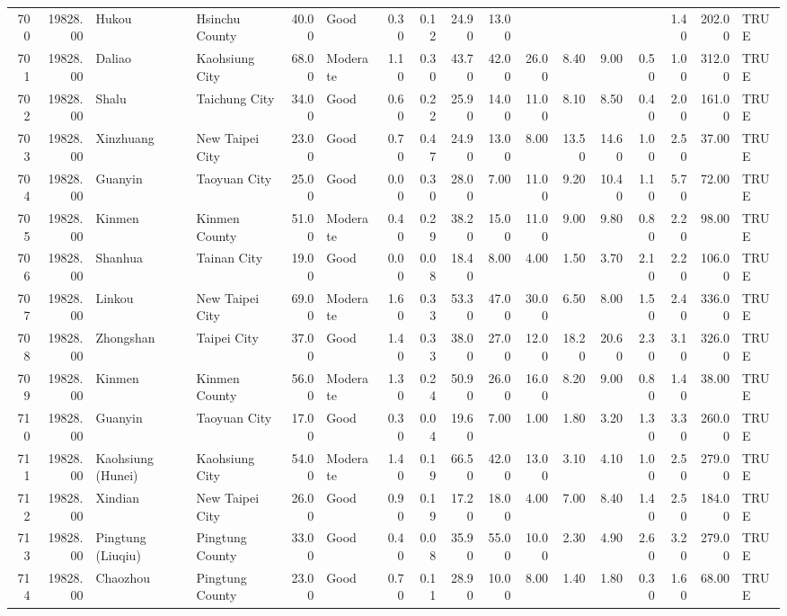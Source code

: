 \begin{table}[ht]
\begin{tabular}{rrllrlrrrrrrrrrrl}
  700 & 19828.00 & Hukou & Hsinchu County & 40.00 & Good & 0.30 & 0.12 & 24.90 & 13.00 &  &  &  &  & 1.40 & 202.00 & TRUE \\ 
  701 & 19828.00 & Daliao & Kaohsiung City & 68.00 & Moderate & 1.10 & 0.30 & 43.70 & 42.00 & 26.00 & 8.40 & 9.00 & 0.50 & 1.00 & 312.00 & TRUE \\ 
  702 & 19828.00 & Shalu & Taichung City & 34.00 & Good & 0.60 & 0.22 & 25.90 & 14.00 & 11.00 & 8.10 & 8.50 & 0.40 & 2.00 & 161.00 & TRUE \\ 
  703 & 19828.00 & Xinzhuang & New Taipei City & 23.00 & Good & 0.70 & 0.47 & 24.90 & 13.00 & 8.00 & 13.50 & 14.60 & 1.00 & 2.50 & 37.00 & TRUE \\ 
  704 & 19828.00 & Guanyin & Taoyuan City & 25.00 & Good & 0.00 & 0.30 & 28.00 & 7.00 & 11.00 & 9.20 & 10.40 & 1.10 & 5.70 & 72.00 & TRUE \\ 
  705 & 19828.00 & Kinmen & Kinmen County & 51.00 & Moderate & 0.40 & 0.29 & 38.20 & 15.00 & 11.00 & 9.00 & 9.80 & 0.80 & 2.20 & 98.00 & TRUE \\ 
  706 & 19828.00 & Shanhua & Tainan City & 19.00 & Good & 0.00 & 0.08 & 18.40 & 8.00 & 4.00 & 1.50 & 3.70 & 2.10 & 2.20 & 106.00 & TRUE \\ 
  707 & 19828.00 & Linkou & New Taipei City & 69.00 & Moderate & 1.60 & 0.33 & 53.30 & 47.00 & 30.00 & 6.50 & 8.00 & 1.50 & 2.40 & 336.00 & TRUE \\ 
  708 & 19828.00 & Zhongshan & Taipei City & 37.00 & Good & 1.40 & 0.33 & 38.00 & 27.00 & 12.00 & 18.20 & 20.60 & 2.30 & 3.10 & 326.00 & TRUE \\ 
  709 & 19828.00 & Kinmen & Kinmen County & 56.00 & Moderate & 1.30 & 0.24 & 50.90 & 26.00 & 16.00 & 8.20 & 9.00 & 0.80 & 1.40 & 38.00 & TRUE \\ 
  710 & 19828.00 & Guanyin & Taoyuan City & 17.00 & Good & 0.30 & 0.04 & 19.60 & 7.00 & 1.00 & 1.80 & 3.20 & 1.30 & 3.30 & 260.00 & TRUE \\ 
  711 & 19828.00 & Kaohsiung (Hunei) & Kaohsiung City & 54.00 & Moderate & 1.40 & 0.19 & 66.50 & 42.00 & 13.00 & 3.10 & 4.10 & 1.00 & 2.50 & 279.00 & TRUE \\ 
  712 & 19828.00 & Xindian & New Taipei City & 26.00 & Good & 0.90 & 0.19 & 17.20 & 18.00 & 4.00 & 7.00 & 8.40 & 1.40 & 2.50 & 184.00 & TRUE \\ 
  713 & 19828.00 & Pingtung (Liuqiu) & Pingtung County & 33.00 & Good & 0.40 & 0.08 & 35.90 & 55.00 & 10.00 & 2.30 & 4.90 & 2.60 & 3.20 & 279.00 & TRUE \\ 
  714 & 19828.00 & Chaozhou & Pingtung County & 23.00 & Good & 0.70 & 0.11 & 28.90 & 10.00 & 8.00 & 1.40 & 1.80 & 0.30 & 1.60 & 68.00 & TRUE \\ 

\end{tabular}
\end{table}
